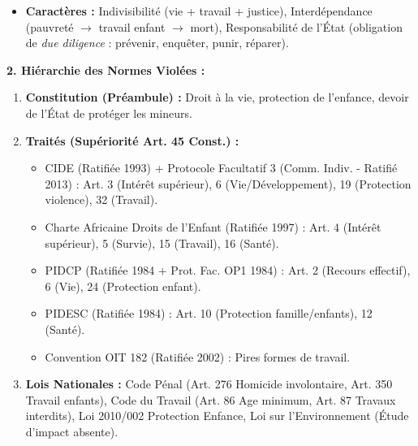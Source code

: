 \documentclass[11pt]{article}
\newcommand{\cle}[1]{{\popxbold\color{popdark}#1}}
\begin{document}
\begin{exoresolu}
\begin{itemize}
            \begin{itemize}
                \item \cle{Droit à la vérité, justice, réparation (Art. 2 PIDCP, Principes Bassiouni/Van Boven)} $\rightarrow$ \textbf{1\textsuperscript{re} génération (Procédural)}.
                \item \cle{Droit à la protection de la famille (Art. 18 Charte Africaine, Art. 10 PIDESC)} $\rightarrow$ \textbf{2\textsuperscript{e} génération}.
            \end{itemize}
        \item \textbf{Caractères :} Indivisibilité (vie + travail + justice), Interdépendance (pauvreté $\rightarrow$ travail enfant $\rightarrow$ mort), Responsabilité de l'État (obligation de \emph{due diligence} : prévenir, enquêter, punir, réparer).
    \end{itemize}
    \textbf{2. Hiérarchie des Normes Violées :}
    \begin{enumerate}
        \item \textbf{Constitution (Préambule) :} Droit à la vie, protection de l'enfance, devoir de l'État de protéger les mineurs.
        \item \textbf{Traités (Supériorité Art. 45 Const.) :}
            \begin{itemize}
                \item \cle{CIDE (Ratifiée 1993) + Protocole Facultatif 3 (Comm. Indiv. - Ratifié 2013) :} Art. 3 (Intérêt supérieur), 6 (Vie/Développement), 19 (Protection violence), 32 (Travail).
                \item \cle{Charte Africaine Droits de l'Enfant (Ratifiée 1997) :} Art. 4 (Intérêt supérieur), 5 (Survie), 15 (Travail), 16 (Santé).
                \item \cle{PIDCP (Ratifiée 1984 + Prot. Fac. OP1 1984) :} Art. 2 (Recours effectif), 6 (Vie), 24 (Protection enfant).
                \item \cle{PIDESC (Ratifiée 1984) :} Art. 10 (Protection famille/enfants), 12 (Santé).
                \item \cle{Convention OIT 182 (Ratifiée 2002) :} Pires formes de travail.
            \end{itemize}
        \item \textbf{Lois Nationales :} Code Pénal (Art. 276 Homicide involontaire, Art. 350 Travail enfants), Code du Travail (Art. 86 Age minimum, Art. 87 Travaux interdits), Loi 2010/002 Protection Enfance, Loi sur l'Environnement (Étude d'impact absente).

\end{enumerate}
\end{exoresolu}
\end{document}
